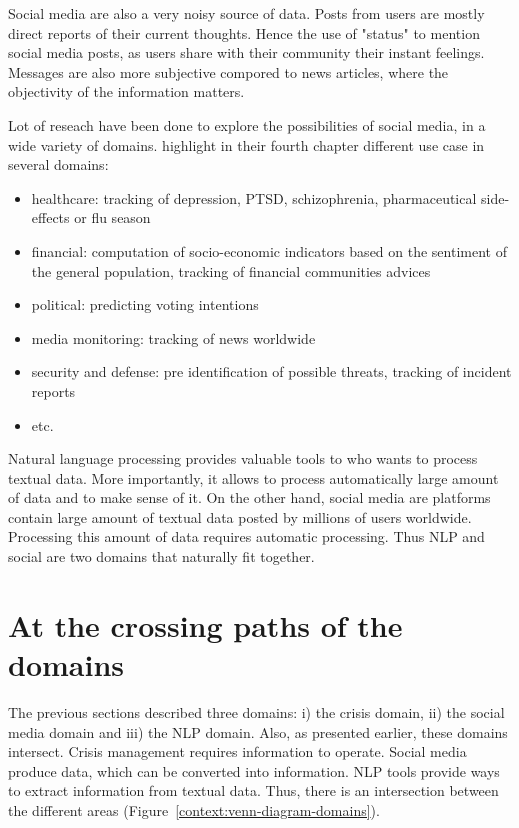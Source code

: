 Social media are also a very noisy source of data.
Posts from users are mostly direct reports of their current thoughts.
Hence the use of "status" to mention social media posts, as users share with their community their instant feelings.
Messages are also more subjective compored to news articles, where the objectivity of the information matters.

Lot of reseach have been done to explore the possibilities of social media, in a wide variety of domains.
highlight in their fourth chapter different use case in several domains:

\begin{itemize}
    \item healthcare: tracking of depression, PTSD, schizophrenia, pharmaceutical side-effects or flu season
    \item financial: computation of socio-economic indicators based on the sentiment of the general population, tracking of financial communities advices
    \item political: predicting voting intentions
    \item media monitoring: tracking of news worldwide
    \item security and defense: pre identification of possible threats, tracking of incident reports
    \item etc.
\end{itemize}

Natural language processing provides valuable tools to who wants to process textual data.
More importantly, it allows to process automatically large amount of data and to make sense of it.
On the other hand, social media are platforms contain large amount of textual data posted by millions of users worldwide.
Processing this amount of data requires automatic processing.
Thus NLP and social are two domains that naturally fit together.

\section{At the crossing paths of the domains}
The previous sections described three domains: i) the crisis domain, ii) the social media domain and iii) the NLP domain.
Also, as presented earlier, these domains intersect.
Crisis management requires information to operate.
Social media produce data, which can be converted into information.
NLP tools provide ways to extract information from textual data.
Thus, there is an intersection between the different areas (Figure~\ref{context:venn-diagram-domains}).

